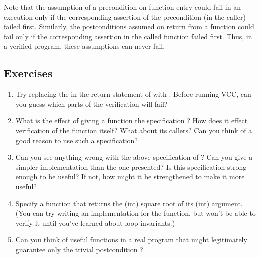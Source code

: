 Note that the assumption of a precondition on function entry could
fail in an execution only if the corresponding assertion of the
precondition (in the caller) failed first. Similarly, the
postconditions assumed on return from a function could fail only if
the corresponding assertion in the called function failed first. Thus,
in a verified program, these assumptions can never fail.

\subsection*{Exercises}
\begin{enumerate}
\item
Try replacing the \vcc{<} in the return statement of  with
\vcc{>}. Before running VCC, can you guess which parts of the
verification will fail?

\item
What is the effect of giving a function the specification
 ? How does it effect verification of
the function itself? What about its callers? Can you think of a good 
reason to use such a specification?


\item
Can you see anything wrong with the above specification of ?
Can you give a simpler implementation than the one presented? Is this 
specification strong enough to be useful? If not, how might it be
strengthened to make it more useful?

\item
Specify a function that returns the (int) square root of its (int)
argument. (You can try writing an implementation for the function, but
won't be able to verify it until you've learned about loop
invariants.)

\item
Can you think of useful functions in a real program that might
legitimately guarantee only the trivial postcondition ?
\end{enumerate}

